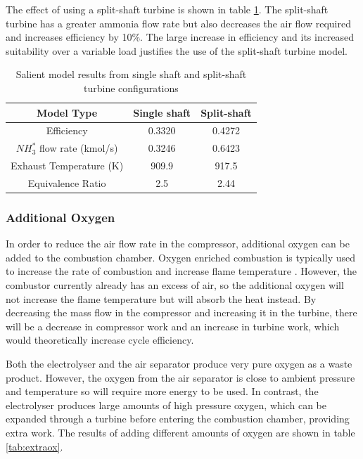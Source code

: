 \documentclass[11pt, oneside]{article}
\begin{document}
The effect of using a split-shaft turbine is shown in table \ref{tab:splitshaft}. The split-shaft turbine has a greater ammonia flow rate but also decreases the air flow required and increases efficiency by 10\%. The large increase in efficiency and its increased suitability over a variable load justifies the use of the split-shaft turbine model. 

\begin {table} [h]
\begin{center}
\caption{Salient model results from single shaft and split-shaft turbine configurations} \label{tab:splitshaft} 
\begin{tabular}{ |c|c|c| }
 \hline
  Model Type & Single shaft & Split-shaft\\ 
 \hline
  Efficiency & 0.3320 & 0.4272 \\ 
  \hline
  $NH_3^*$ flow rate (kmol/s) & 0.3246 & 0.6423\\ 
 \hline
  Exhaust Temperature (K) & 909.9 & 917.5\\
  \hline
  Equivalence Ratio & 2.5 & 2.44\\
 \hline
\end{tabular}
\end{center}  
\end {table}

\subsubsection{Additional Oxygen}
In order to reduce the air flow rate in the compressor, additional oxygen can be added to the combustion chamber. Oxygen enriched combustion is typically used to increase the rate of combustion and increase flame temperature \cite{oxyfuel}. However, the combustor currently already has an excess of air, so the additional oxygen will not increase the flame temperature but will absorb the heat instead. By decreasing the mass flow in the compressor and increasing it in the turbine, there will be a decrease in compressor work and an increase in turbine work, which would theoretically increase cycle efficiency. 

Both the electrolyser and the air separator produce very pure oxygen as a waste product. However, the oxygen from the air separator is close to ambient pressure and temperature so will require more energy to be used. In contrast, the electrolyser produces large amounts of high pressure oxygen, which can be expanded through a turbine before entering the combustion chamber, providing extra work. The results of adding different amounts of oxygen are shown in table \ref{tab:extraox}.
\end{document}
